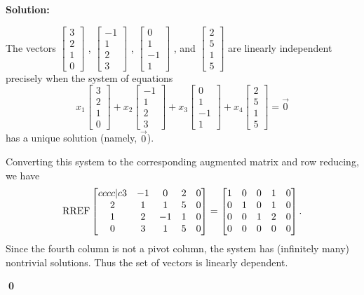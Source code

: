 \documentclass{article}
\newenvironment{solution}
{
  \ignorespaces
  \textbf{Solution:}
}
{
  \ignorespacesafterend
  \begin{flushright}
  {\bfseries \qed}
  \end{flushright}
}
\begin{document}
\begin{solution}
The vectors 
\( \begin{bmatrix} 3 \\ 2 \\ 1 \\ 0 \end{bmatrix} \) ,
\( \begin{bmatrix} -1 \\ 1 \\ 2 \\ 3 \end{bmatrix} \) ,
\( \begin{bmatrix} 0 \\ 1 \\ -1 \\ 1 \end{bmatrix} \) , and
\( \begin{bmatrix} 2 \\ 5 \\ 1 \\ 5 \end{bmatrix} \) are linearly independent precisely when the system of equations 
\[ x_1\begin{bmatrix} 3 \\ 2 \\ 1 \\ 0 \end{bmatrix} +
 x_2\begin{bmatrix} -1 \\ 1 \\ 2 \\ 3 \end{bmatrix} +
 x_3\begin{bmatrix} 0 \\ 1 \\ -1 \\ 1 \end{bmatrix}+ 
 x_4\begin{bmatrix} 2 \\ 5 \\ 1 \\ 5 \end{bmatrix} =\vec{0}\]
has a unique solution (namely, \(\vec{0}\)). 

Converting this system to the corresponding augmented matrix and row reducing, we have
\[\operatorname{RREF} \begin{bmatrix}{cccc|c} 3 & -1 & 0 & 2 & 0 \\ 2 & 1 & 1 & 5 & 0 \\ 1 & 2 & -1 & 1 & 0 \\ 0 & 3 & 1 & 5 & 0\end{bmatrix} =
\begin{bmatrix} 1 & 0 & 0 & 1 & 0 \\ 0 & 1 & 0 & 1& 0  \\ 0 & 0 & 1 & 2& 0  \\ 0 & 0 & 0 & 0& 0  \end{bmatrix}.\] 
Since the fourth column is not a pivot column, the system  has (infinitely many) nontrivial solutions.
Thus the set of  vectors is linearly dependent.
\end{solution}
\end{document}
